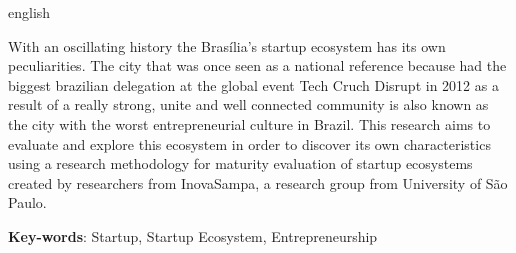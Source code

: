 \begin{resumo}[Abstract]
 \begin{otherlanguage*}{english}

With an oscillating history the Brasília's startup ecosystem has its own peculiarities. The city that was once seen as a national reference because had the biggest brazilian delegation at the global event Tech Cruch Disrupt in 2012 as a result of a really strong, unite and well connected community is also known as the city with the worst entrepreneurial culture in Brazil. This research aims to evaluate and explore this ecosystem in order to discover its own characteristics using a research methodology for maturity evaluation of startup ecosystems created by researchers from InovaSampa, a research group from University of São Paulo.

   \vspace{\onelineskip}

   \noindent
   \textbf{Key-words}: Startup, Startup Ecosystem, Entrepreneurship
 \end{otherlanguage*}
\end{resumo}
